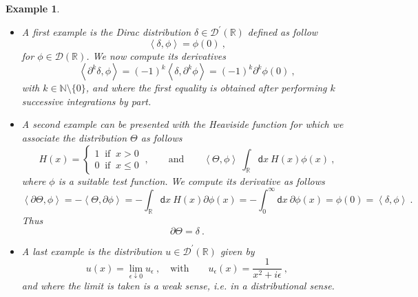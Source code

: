 \documentclass[11pt]{book}
\newcommand{\sm}[1]{\left\langle#1\right\rangle}
\newcommand{\Dcal}{\mathcal{D}}
\newcommand{\Nbb}{\mathbb{N}}
\newcommand{\Rbb}{\mathbb{R}}
\newcommand{\dsf}{\mathsf{d}}
\theoremstyle{break}
\newtheorem{example}{Example}[chapter]
\begin{document}
\begin{example}
\begin{itemize}

\item A first example is the Dirac distribution $\delta \in \Dcal^\prime(\Rbb)$ defined as follow
%
\begin{equation*}
\sm{\delta , \phi} = \phi(0) \ , 
\end{equation*}
%
for $\phi \in \Dcal(\Rbb)$. We now compute its derivatives
%
\begin{equation*}
\sm{\partial^k \delta , \phi} = (-1)^k \sm{\delta , \partial^k \phi} =  (-1)^k \partial^k \phi(0) \ ,
\end{equation*}
%
with $k \in \Nbb \setminus \{0\}$, and where the first equality is obtained after performing $k$ successive integrations by part. 


\item A second example can be presented with the Heaviside function for which we associate the distribution $\Theta$ as follows
%
\begin{equation*}
H(x) = \left\{
\begin{array}{l}
1 \ \mbox{ if } \ x > 0 \\
0 \ \mbox{ if } \ x \leq 0
\end{array}
\right. \ , \qquad \mbox{and} \qquad \sm{\Theta,\phi} \ \int_\Rbb \dsf x \ H(x) \phi(x) \ ,
\end{equation*}
%
where $\phi$ is a suitable test function. We compute its derivative as follows
%
\begin{equation*}
\sm{\partial \Theta , \phi} = - \sm{\Theta , \partial \phi} = - \int_\Rbb \dsf x \ H(x) \partial \phi(x) = - \int_0^\infty \dsf x \ \partial \phi(x) = \phi(0) = \sm{\delta , \phi} \ .
\end{equation*}
%
Thus
%
\begin{equation*}
\partial \Theta = \delta \ . 
\end{equation*}


\item A last example is the distribution $u \in \Dcal^\prime(\Rbb)$ given by
%
\begin{equation*}
u(x) = \lim_{\epsilon \downarrow 0} u_\epsilon \ , \quad \mbox{with} \qquad u_\epsilon(x) = \frac{1}{x^2 + i \epsilon} \ ,
\end{equation*}
%
and where the limit is taken is a weak sense, i.e. in a distributional sense.

\end{itemize}
\end{example}
\end{document}
